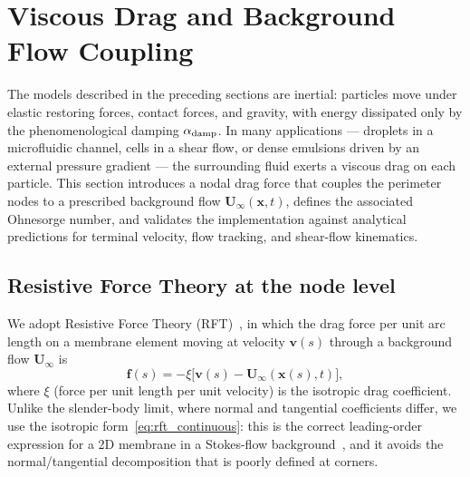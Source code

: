 \documentclass[aps,pre,twocolumn,floatfix,longbibliography]{revtex4-2}
\begin{document}
\section{Viscous Drag and Background Flow Coupling}
\label{sec:drag}

The models described in the preceding sections are inertial: particles move under
elastic restoring forces, contact forces, and gravity, with energy dissipated only
by the phenomenological damping $\alpha_{\rm damp}$.  In many applications --- droplets
in a microfluidic channel, cells in a shear flow, or dense emulsions driven by an
external pressure gradient --- the surrounding fluid exerts a viscous drag on each
particle.  This section introduces a nodal drag force that couples the perimeter
nodes to a prescribed background flow $\mathbf{U}_{\infty}(\mathbf{x},t)$, defines the
associated Ohnesorge number, and validates the implementation against analytical
predictions for terminal velocity, flow tracking, and shear-flow kinematics.

\subsection{Resistive Force Theory at the node level}
\label{sec:drag_rft}

We adopt Resistive Force Theory
(RFT)~\cite{GrayHancock1955,LaugaPowers2009}, in which the drag force per unit
arc length on a membrane element moving at velocity $\mathbf{v}(s)$ through a
background flow $\mathbf{U}_{\infty}$ is
\begin{equation}
  \mathbf{f}(s) = -\xi\bigl[\mathbf{v}(s) - \mathbf{U}_{\infty}(\mathbf{x}(s),t)\bigr],
  \label{eq:rft_continuous}
\end{equation}
where $\xi$ (force per unit length per unit velocity) is the isotropic drag
coefficient.  Unlike the slender-body limit, where normal and tangential
coefficients differ, we use the isotropic form~\eqref{eq:rft_continuous}: this is
the correct leading-order expression for a 2D membrane in a Stokes-flow
background~\cite{Pozrikidis1992,KimKarrila1991}, and it avoids the
normal/tangential decomposition that is poorly defined at corners.
\end{document}
